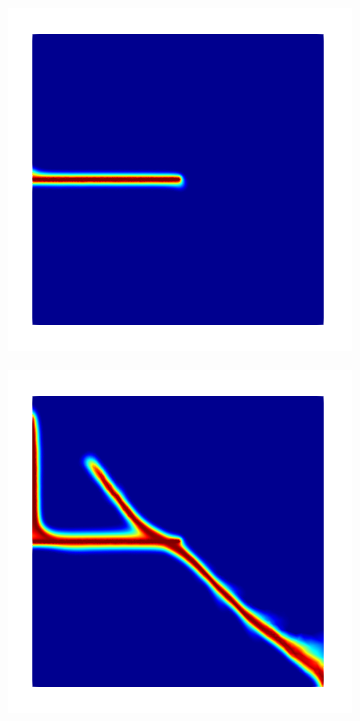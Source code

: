 \begin{figure}[htb!]
\begin{subfigure}[b]{0.21\textwidth}
    \caption{}
  \end{subfigure}
  \begin{subfigure}[b]{0.21\textwidth}
    \centering
    \includegraphics[width=\textwidth,scale=0.5]{Chapter4/figures/mode2_intact_plate_spectral_intermediate.png}
    \caption{}
    \label{fig: Chapter4/mode2_intact_plate_spectral_intermediate}
  \end{subfigure}
  \begin{subfigure}[b]{0.21\textwidth}
    \centering
    \includegraphics[width=\textwidth,scale=0.5]{Chapter4/figures/mode2_intact_plate_spectral_final.png}

\end{subfigure}
\end{figure}
